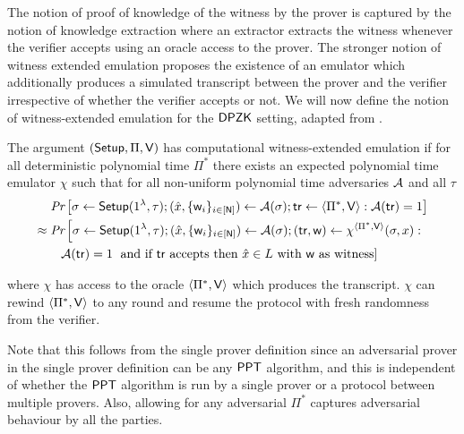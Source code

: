 The notion of proof of knowledge of the witness by the prover is captured by the notion of knowledge extraction where an extractor extracts the witness whenever the verifier accepts using an oracle access to the prover. The stronger notion of witness extended emulation \cite{Lindell03} proposes the existence of an emulator which additionally produces a simulated transcript between the prover and the verifier irrespective of whether the verifier accepts or not. We will now define the notion of witness-extended emulation for the $\mathsf{DPZK}$ setting, adapted from \cite{Groth11}. 
\begin{definition}
The argument $(\mathsf{Setup}, \Pi, \mathsf{V})$ has computational witness-extended emulation if for all deterministic polynomial time $\Pi^*$ there exists an expected polynomial time emulator $\chi$ such that for all non-uniform polynomial time adversaries $\mathcal{A}$ and all $\tau$
\begin{align*}
& \text{\em Pr} \left[\sigma \leftarrow \mathsf{Setup}(1^{\lambda}, \tau); (\hat{x}, \{\mathsf{w}_i\}_{i \in [\mathsf{N}]}) \leftarrow \mathcal{A}(\sigma); \mathsf{tr} \leftarrow \langle \Pi^*, \mathsf{V} \rangle: \mathcal{A}(\mathsf{tr}) = 1 \right] \\
\approx \; & \text{\em Pr} \left[\sigma \leftarrow \mathsf{Setup}(1^{\lambda}, \tau); (\hat{x}, \{\mathsf{w}_i\}_{i \in [\mathsf{N}]}) \leftarrow \mathcal{A}(\sigma); (\mathsf{tr}, \mathsf{w}) \leftarrow \chi^{\langle \Pi^*, \mathsf{V} \rangle}(\sigma, x): \right. \\
&\;\;\; \mathcal{A}(\mathsf{tr}) = 1 \left. \text{ and if } \mathsf{tr} \text{ accepts then } \hat{x} \in L \text{ with } \mathsf{w} \text{ as witness} \right] 
\end{align*}

where $\chi$ has access to the oracle $\langle \Pi^*, \mathsf{V} \rangle$ which produces the transcript. $\chi$ can rewind $\langle \Pi^*, \mathsf{V} \rangle$ to any round and resume the protocol with fresh randomness from the verifier.
\end{definition}
Note that this follows from the single prover definition since an adversarial prover in the single prover definition can be any $\mathsf{PPT}$ algorithm, and this is independent of whether the $\mathsf{PPT}$ algorithm is run by a single prover or a protocol between multiple provers.
Also, allowing for any adversarial $\Pi^*$ captures adversarial behaviour by all the parties.

